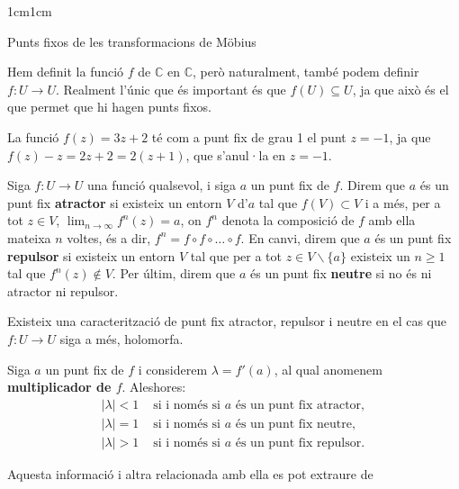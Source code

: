 \begin{adjustwidth}{1cm}{1cm}
\begin{subsection}{Punts fixos de les transformacions de Möbius}
\begin{nota}
    Hem definit la funció $f$ de $\mathbb{C}$ en $\mathbb{C}$, però naturalment, també podem definir $f:U\to U$. Realment l'únic que és important és que $f(U)\subseteq U$, ja que això és el que permet que hi hagen punts fixos. 
\end{nota}

\begin{exemple}
    La funció $f(z)=3z+2$ té com a punt fix de grau 1 el punt $z=-1$, ja que $f(z)-z=2z+2=2(z+1)$, que s'anul·la en $z=-1$.
\end{exemple}

\begin{definicio}
    Siga $f:U\to U$ una funció qualsevol, i siga $a$ un punt fix de $f$. Direm que $a$ és un punt fix \textbf{atractor} si existeix un entorn $V$ d'$a$ tal que $f(V)\subset V$ i a més, per a tot $z\in V$, $\displaystyle\lim_{n\to\infty}f^n(z)=a$, on $f^n$ denota la composició de $f$ amb ella mateixa $n$ voltes, és a dir, $f^n=f\circ f\circ \dots \circ f$. En canvi, direm que $a$ és un punt fix \textbf{repulsor} si existeix un entorn $V$ tal que per a tot $z\in V\backslash\{a\}$ existeix un $n\geq 1$ tal que $f^n(z)\notin V$. Per últim, direm que $a$ és un punt fix \textbf{neutre} si no és ni atractor ni repulsor.
\end{definicio}

\begin{proposicio}
    Existeix una caracterització de punt fix atractor, repulsor i neutre en el cas que $f: U\to U$ siga a més, holomorfa.

    Siga $a$ un punt fix de $f$ i considerem $\lambda=f'(a)$, al qual anomenem \textbf{multiplicador de $f$}. Aleshores:
    \begin{equation}
        \begin{aligned}
            |\lambda|<1 &\text{ si i només si } a \text{ és un punt fix atractor},\\
            |\lambda|=1 &\text{ si i només si } a \text{ és un punt fix neutre},\\
            |\lambda|>1 &\text{ si i només si } a \text{ és un punt fix repulsor}.
        \end{aligned}
        \label{caract_pf_atr_neu_rep}
    \end{equation}

    Aquesta informació i altra relacionada amb ella es pot extraure de \cite[pp. 45,76]{milnor}
\label{prop_caract_pf}
\end{proposicio}
    

\end{subsection}
\end{adjustwidth}
